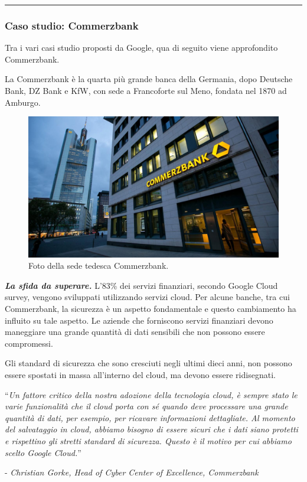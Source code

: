 \documentclass[a4paper]{article}
\newcommand{\longline}{\noindent\rule{\textwidth}{0.4pt}}
\newcommand{\dquotes}[1]{``#1''}
\begin{document}
	\longline
	
	\subsubsection{Caso studio: Commerzbank}
	
	Tra i vari casi studio proposti da Google, qua di seguito viene approfondito Commerzbank.\newline
	
	\noindent
	La Commerzbank è la quarta più grande banca della Germania, dopo Deutsche Bank, DZ Bank e KfW, con sede a Francoforte sul Meno, fondata nel 1870 ad Amburgo.
	\begin{figure}[!htp]
		\centering
		\includegraphics[width=\textwidth]{img/Googe-2.jpg}
		\caption{Foto della sede tedesca Commerzbank.}
	\end{figure}\newpage
	
	\noindent
	\textbf{\emph{La sfida da superare.}} L'83\% dei servizi finanziari, secondo Google Cloud survey, vengono sviluppati utilizzando servizi cloud. Per alcune banche, tra cui Commerzbank, la sicurezza è un aspetto fondamentale e questo cambiamento ha influito su tale aspetto. Le aziende che forniscono servizi finanziari devono maneggiare una grande quantità di dati sensibili che non possono essere compromessi.
	
	Gli standard di sicurezza che sono cresciuti negli ultimi dieci anni, non possono essere spostati in massa all'interno del cloud, ma devono essere ridisegnati.
	\begin{center}
		\dquotes{\emph{Un fattore critico della nostra adozione della tecnologia cloud, è sempre stato le varie funzionalità che il cloud porta con sé quando deve processare una grande quantità di dati, per esempio, per ricavare informazioni dettagliate. Al momento del salvataggio in cloud, abbiamo bisogno di essere sicuri che i dati siano protetti e rispettino gli stretti standard di sicurezza. Questo è il motivo per cui abbiamo scelto Google Cloud.}}\newline
		
		\noindent
		- \emph{Christian Gorke, Head of Cyber Center of Excellence, Commerzbank}
	\end{center}\:\newline
	
\end{document}
